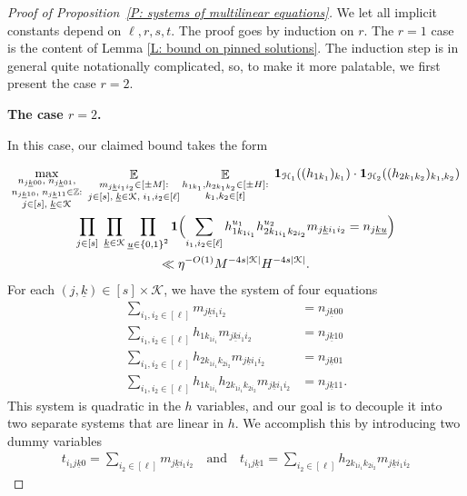 \documentclass[11pt]{amsart}
\theoremstyle{definition}
\DeclareMathOperator*{\E}{\mathbb{E}}
\newcommand{\Z}{{\mathbb Z}}
\newcommand{\CH}{{\mathcal H}}
\newcommand{\CK}{{\mathcal K}}
\newcommand{\uk}{{\underline{k}}}
\newcommand{\uu}{{\underline{u}}}
\newcommand{\Bigbrac}[1]{\Bigl( #1 \Bigr)}
\begin{document}
\begin{proof}[Proof of Proposition~\ref{P: systems of multilinear equations}] We let all implicit constants depend on $\ell, r, s, t$. The proof goes by induction on $r$.  The $r=1$ case is the content of Lemma \ref{L: bound on pinned solutions}.  The induction step is in general quite notationally complicated, so, to make it more palatable, we first present the case $r=2$.

\smallskip
\textbf{The case $r=2$.}
\smallskip

In this case, our claimed bound takes the form

        \begin{multline*}
        \max_{\substack{n_{j\uk00},\; n_{j\uk01},\\ n_{j\uk10},\; n_{j\uk11}\in\Z:\\ j\in[s],\; \uk\in\CK}}\;\E_{\substack{m_{j\uk i_1 i_2}\in[\pm M]:\\ j\in[s],\; \uk\in\CK,\; i_1, i_2\in[\ell]}}
                \E_{\substack{h_{1k_1}, h_{2k_1k_2}\in[\pm H]:\\ k_1, k_2\in[t]}}\; \mathbf{1}_{\CH_1}((h_{1k_1})_{k_1}) \cdot \mathbf{1}_{\CH_2}((h_{2k_1k_2})_{k_1, k_2})\\
        \prod_{j\in[s]}\; \prod_{\substack{\uk\in\CK}}\prod_{\substack{\uu\in\{0,1\}^2
        }} \mathbf{1}\Bigbrac{\sum\limits_{i_1, i_2\in[\ell]} h_{1k_{1i_1}}^{u_1} h_{2k_{1i_1}k_{2i_2}}^{u_2}m_{j\uk i_1 i_2} = n_{j\uk\uu}}\\
        \ll \eta^{-O(1)}  M^{-4s|\CK|} H^{-4s|\CK|}.
    \end{multline*}
    For each $(j,\uk)\in[s]\times \CK$, we have the system of four equations
\begin{align*}
    \sum\limits_{i_1, i_2\in[\ell]} m_{j\uk i_1 i_2} &= n_{j\uk00}\\
    \sum\limits_{i_1, i_2\in[\ell]} h_{1k_{1i_1}} m_{j\uk i_1 i_2} &= n_{j\uk10}\\
    \sum\limits_{i_1, i_2\in[\ell]} h_{2k_{1i_1}k_{2i_2}} m_{j\uk i_1 i_2} &= n_{j\uk01}\\
    \sum\limits_{i_1, i_2\in[\ell]} h_{1k_{1i_1}} h_{2k_{1i_1}k_{2i_2}} m_{j\uk i_1 i_2} &= n_{j\uk11}.
\end{align*}
This system is quadratic in the $h$ variables, and our goal is to decouple it into two separate systems that are linear in $h$. We accomplish this by introducing two dummy variables
\begin{align*}
    t_{i_1 j \uk 0} = \sum_{i_2\in[\ell]}m_{j\uk i_1 i_2}\quad \textrm{and}\quad t_{i_1 j \uk 1} = \sum_{i_2\in[\ell]}h_{2k_{1i_1}k_{2i_2}} m_{j\uk i_1 i_2}

\end{align*}
\end{proof}
\end{document}

